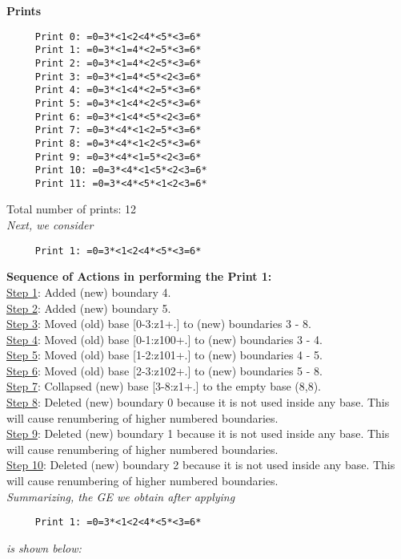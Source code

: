 \documentclass[final]{article}
\begin{document}
{\bf Prints}
\begin{verbatim}
     Print 0: =0=3*<1<2<4*<5*<3=6*
     Print 1: =0=3*<1=4*<2=5*<3=6*
     Print 2: =0=3*<1=4*<2<5*<3=6*
     Print 3: =0=3*<1=4*<5*<2<3=6*
     Print 4: =0=3*<1<4*<2=5*<3=6*
     Print 5: =0=3*<1<4*<2<5*<3=6*
     Print 6: =0=3*<1<4*<5*<2<3=6*
     Print 7: =0=3*<4*<1<2=5*<3=6*
     Print 8: =0=3*<4*<1<2<5*<3=6*
     Print 9: =0=3*<4*<1=5*<2<3=6*
     Print 10: =0=3*<4*<1<5*<2<3=6*
     Print 11: =0=3*<4*<5*<1<2<3=6*
\end{verbatim}
Total number of prints: 12\\
{\em Next, we consider}
\begin{verbatim}
     Print 1: =0=3*<1<2<4*<5*<3=6*
\end{verbatim}
{\bf Sequence of Actions in performing the Print 1:}\\
{\underline{Step 1}:} Added (new) boundary 4.\\
{\underline{Step 2}:} Added (new) boundary 5.\\
{\underline{Step 3}:} Moved (old) base [0-3:z1+.]  to (new) boundaries 3 - 8.\\
{\underline{Step 4}:} Moved (old) base [0-1:z100+.]  to (new) boundaries 3 - 4.\\
{\underline{Step 5}:} Moved (old) base [1-2:z101+.]  to (new) boundaries 4 - 5.\\
{\underline{Step 6}:} Moved (old) base [2-3:z102+.]  to (new) boundaries 5 - 8.\\
{\underline{Step 7}:} Collapsed (new) base [3-8:z1+.]  to the empty base (8,8).
\\
{\underline{Step 8}:} Deleted (new) boundary 0 because it is not used inside any base.  This will cause renumbering of higher numbered boundaries.
\\
{\underline{Step 9}:} Deleted (new) boundary 1 because it is not used inside any base.  This will cause renumbering of higher numbered boundaries.
\\
{\underline{Step 10}:} Deleted (new) boundary 2 because it is not used inside any base.  This will cause renumbering of higher numbered boundaries.
\\[0.1in]
{\em Summarizing, the GE we obtain after applying}
\begin{verbatim}
     Print 1: =0=3*<1<2<4*<5*<3=6*
\end{verbatim}
{\em is shown below:}
\end{document}
